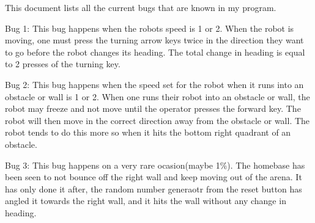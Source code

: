 This document lists all the current bugs that are known in my program.

Bug 1\+: This bug happens when the robot\textquotesingle{}s speed is 1 or 2. When the robot is moving, one must press the turning arrow keys twice in the direction they want to go before the robot changes it\textquotesingle{}s heading. The total change in heading is equal to 2 presses of the turning key.

Bug 2\+: This bug happens when the speed set for the robot when it runs into an obstacle or wall is 1 or 2. When one runs their robot into an obstacle or wall, the robot may freeze and not move until the operator presses the forward key. The robot will then move in the correct direction away from the obstacle or wall. The robot tends to do this more so when it hits the bottom right quadrant of an obstacle.

Bug 3\+: This bug happens on a very rare ocasion(maybe 1\%). The homebase has been seen to not bounce off the right wall and keep moving out of the arena. It has only done it after, the random number generaotr from the reset button has angled it towards the right wall, and it hits the wall without any change in heading. 